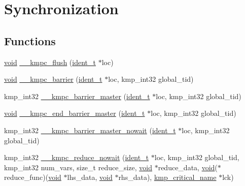 \hypertarget{group__SYNCHRONIZATION}{\section{Synchronization}
\label{group__SYNCHRONIZATION}
}
\subsection*{Functions}
\begin{DoxyCompactItemize}
\item 
\hyperlink{ittnotify__static_8h_af941d56e55e3c5465135b60c4d6343ed}{void} \hyperlink{group__SYNCHRONIZATION_ga90f0e4bf417a06cff2a4f895daa4ff37}{\-\_\-\-\_\-kmpc\-\_\-flush} (\hyperlink{group__BASIC__TYPES_ga690fda6b92f039a72db263c6b4394ddb}{ident\-\_\-t} $\ast$loc)
\item 
\hyperlink{ittnotify__static_8h_af941d56e55e3c5465135b60c4d6343ed}{void} \hyperlink{group__SYNCHRONIZATION_ga84b2ebeef737395dddd8ef446c071760}{\-\_\-\-\_\-kmpc\-\_\-barrier} (\hyperlink{group__BASIC__TYPES_ga690fda6b92f039a72db263c6b4394ddb}{ident\-\_\-t} $\ast$loc, kmp\-\_\-int32 global\-\_\-tid)
\item 
kmp\-\_\-int32 \hyperlink{group__SYNCHRONIZATION_gacea2959cabb92c4a941087e524c5f3d5}{\-\_\-\-\_\-kmpc\-\_\-barrier\-\_\-master} (\hyperlink{group__BASIC__TYPES_ga690fda6b92f039a72db263c6b4394ddb}{ident\-\_\-t} $\ast$loc, kmp\-\_\-int32 global\-\_\-tid)
\item 
\hyperlink{ittnotify__static_8h_af941d56e55e3c5465135b60c4d6343ed}{void} \hyperlink{group__SYNCHRONIZATION_ga35415691dad1e3430caa78c9d4b34cb3}{\-\_\-\-\_\-kmpc\-\_\-end\-\_\-barrier\-\_\-master} (\hyperlink{group__BASIC__TYPES_ga690fda6b92f039a72db263c6b4394ddb}{ident\-\_\-t} $\ast$loc, kmp\-\_\-int32 global\-\_\-tid)
\item 
kmp\-\_\-int32 \hyperlink{group__SYNCHRONIZATION_ga5a51fa2c8f61d807895e377d6c732b16}{\-\_\-\-\_\-kmpc\-\_\-barrier\-\_\-master\-\_\-nowait} (\hyperlink{group__BASIC__TYPES_ga690fda6b92f039a72db263c6b4394ddb}{ident\-\_\-t} $\ast$loc, kmp\-\_\-int32 global\-\_\-tid)
\item 
kmp\-\_\-int32 \hyperlink{group__SYNCHRONIZATION_gafc5438d4c4f01dcd347d9bfde27f68e1}{\-\_\-\-\_\-kmpc\-\_\-reduce\-\_\-nowait} (\hyperlink{group__BASIC__TYPES_ga690fda6b92f039a72db263c6b4394ddb}{ident\-\_\-t} $\ast$loc, kmp\-\_\-int32 global\-\_\-tid, kmp\-\_\-int32 num\-\_\-vars, size\-\_\-t reduce\-\_\-size, \hyperlink{ittnotify__static_8h_af941d56e55e3c5465135b60c4d6343ed}{void} $\ast$reduce\-\_\-data, \hyperlink{ittnotify__static_8h_af941d56e55e3c5465135b60c4d6343ed}{void}($\ast$reduce\-\_\-func)(\hyperlink{ittnotify__static_8h_af941d56e55e3c5465135b60c4d6343ed}{void} $\ast$lhs\-\_\-data, \hyperlink{ittnotify__static_8h_af941d56e55e3c5465135b60c4d6343ed}{void} $\ast$rhs\-\_\-data), \hyperlink{kmp_8h_ac3fc9c92929f696709b178ffe0854839}{kmp\-\_\-critical\-\_\-name} $\ast$lck)

\end{DoxyCompactItemize}

